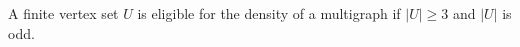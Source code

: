\begin{definition}
A finite vertex set $U$ is eligible for the density of a multigraph if
$|U|\ge 3$ and $|U|$ is odd.
\end{definition}
